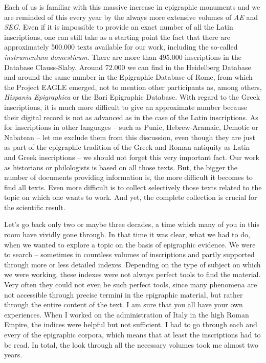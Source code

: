\documentclass{article}
\begin{document}
Each of us is familiar with this massive increase in epigraphic monuments and we 
are reminded of this every year by the always more extensive volumes of \textit{AE 
}and \textit{SEG}. Even if it is impossible to provide an exact number of all the 
Latin inscriptions, one can still take as a starting point the fact that there 
are approximately 500.000 texts available for our work, including the so-called 
\textit{instrumentum domesticum}. There are more than 495.000 inscriptions in the 
Database Clauss-Slaby. Around 72.000 we can find in the Heidelberg Database and 
around the same number in the Epigraphic Database of Rome, from which the Project 
EAGLE emerged, not to mention other participants as, among others, \textit{Hispania 
Epigraphica }or the Bari Epigraphic Database. With regard to the Greek inscriptions, 
it is much more difficult to give an approximate number because their digital record 
is not as advanced as in the case of the Latin inscriptions. As for inscriptions 
in other languages – such as Punic, Hebrew-Aramaic, Demotic or Nabatean – let 
me exclude them from this discussion, even though they are just as part of the 
epigraphic tradition of the Greek and Roman antiquity as Latin and Greek inscriptions 
– we should not forget this very important fact. Our work as historians or philologists 
is based on all those texts. But, the bigger the number of documents providing 
information is, the more difficult it becomes to find all texts. Even more difficult 
is to collect selectively those texts related to the topic on which one wants to 
work. And yet, the complete collection is crucial for the scientific result.

Let's go back only two or maybe three decades, a time which many of you in this 
room have vividly gone through. In that time it was clear, what we had to do, when 
we wanted to explore a topic on the basis of epigraphic evidence. We were to search 
– sometimes in countless volumes of inscriptions and partly supported through 
more or less detailed indexes. Depending on the type of subject on which we were 
working, these indexes were not always perfect tools to find the material. Very 
often they could not even be such perfect tools, since many phenomena are not accessible 
through precise termini in the epigraphic material, but rather through the entire 
content of the text. I am sure that you all have your own experiences. When I worked 
on the administration of Italy in the high Roman Empire, the indices were helpful 
but not sufficient. I had to go through each and every of the epigraphic corpora, 
which means that at least the inscriptions had to be read. In total, the look through 
all the necessary volumes took me almost two years. 
\end{document}

